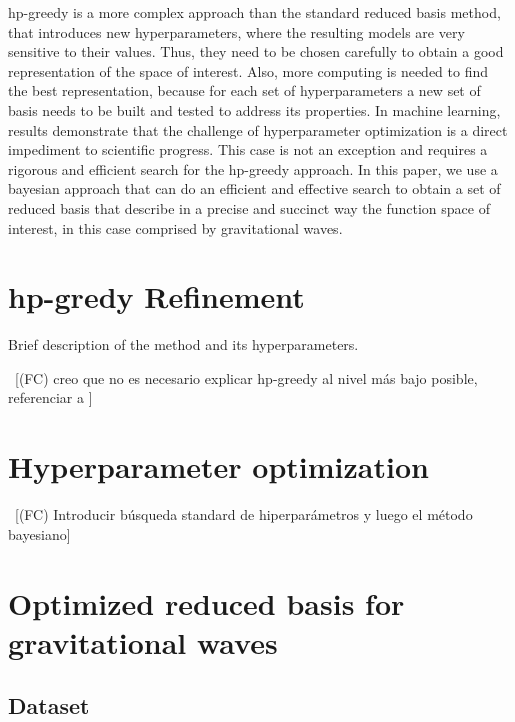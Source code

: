 \documentclass[nofootinbib]{revtex4-2}
\newcommand{\fc}[1]{{\color{violet}~\textsf{[(FC) #1]}}}
\begin{document}
hp-greedy is a more complex approach than the standard reduced basis method, that introduces new hyperparameters, where the resulting models are very sensitive to their values. Thus, they need to be chosen carefully to obtain a good representation of the space of interest. Also, more computing is needed to find the best representation, because for each set of hyperparameters a new set of basis needs to be built and tested to address its properties. In machine learning, results demonstrate that the challenge of hyperparameter optimization is a direct impediment to scientific progress. This case is not an exception and requires a rigorous and efficient search for the hp-greedy approach. In this paper, we use a bayesian approach that can do an efficient and effective search to obtain a set of reduced basis that describe in a precise and succinct way the function space of interest, in this case comprised by gravitational waves.
 

\section{hp-gredy Refinement} \label{sec:hp}
Brief description of the method \cite{cerino2022automated,EftangThesis} and its hyperparameters. 

\fc{creo que no es necesario explicar hp-greedy al nivel más bajo posible, referenciar a \cite{cerino2022automated,EftangThesis}}

\section{Hyperparameter optimization} \label{sec:bay}
\fc{Introducir búsqueda standard de hiperparámetros y luego el método bayesiano}
\section{Optimized reduced basis for gravitational waves} \label{sec:results}

\subsection{Dataset} \label{sec:dataset}
\end{document}
